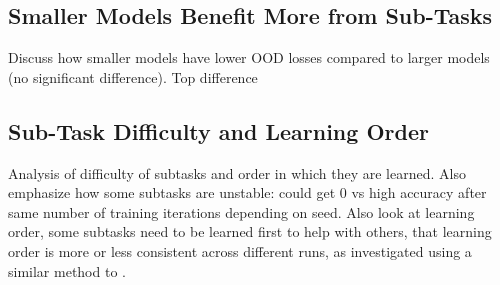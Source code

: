 \label{fig:subtask_overfitting}

\subsection{Smaller Models Benefit More from Sub-Tasks}
Discuss how smaller models have lower OOD losses compared to larger models (no significant difference). Top difference

\label{fig:64_dim_performance}


\subsection{Sub-Task Difficulty and Learning Order}
Analysis of difficulty of subtasks and order in which they are learned. Also emphasize how some subtasks are unstable: could get 0 vs high accuracy after same number of training iterations depending on seed. Also look at learning order, some subtasks need to be learned first to help with others, that learning order is more or less consistent across different runs, as investigated using a similar method to \cite{lee_what_2022}.

\label{fig:subtask_difficulty}

\label{fig:subtask_order}
